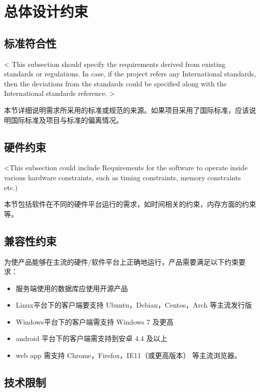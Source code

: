 \chapter{总体设计约束}

 
\section{标准符合性}
< This subsection should specify the requirements derived from existing standards or regulations. In case, if the project refers any International standards, then the deviations from the standards could be specified along with the International standards reference. >

本节详细说明需求所采用的标准或规范的来源。如果项目采用了国际标准，应该说明国际标准及项目与标准的偏离情况。

\section{硬件约束}
<This subsection could include Requirements for the software to operate inside various hardware constraints, such as timing constraints, memory constraints etc.)

本节包括软件在不同的硬件平台运行的需求，如时间相关的约束，内存方面的约束等。

\section{兼容性约束}
为使产品能够在主流的硬件/软件平台上正确地运行，产品需要满足以下约束要求：
\begin{itemize}
    \item 服务端使用的数据库应使用开源产品
    \item Linux平台下的客户端要支持 Ubuntu，Debian，Centos，Arch 等主流发行版
    \item Windows平台下的客户端需支持 Windows 7 及更高
    \item android 平台下的客户端需支持到安卓 4.4 及以上
    \item web app 需支持 Chrome，Firefox，IE11（或更高版本） 等主流浏览器。
    \end{itemize}

\section{技术限制}


